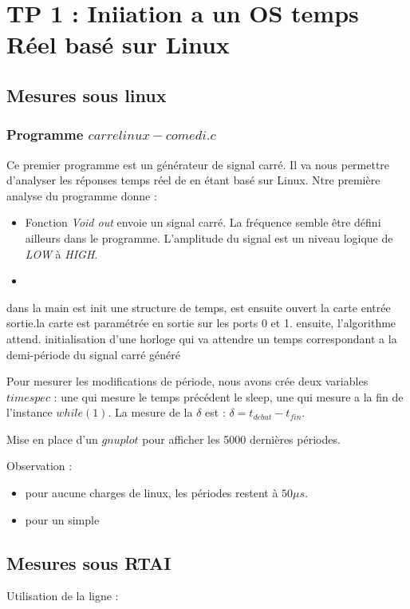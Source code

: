 \chapter{TP 1 : Iniiation a un OS temps Réel basé sur Linux}

\section{Mesures sous linux}
\subsection{Programme $carrelinux-comedi.c$}
Ce premier programme est un générateur de signal carré. Il va nous permettre d'analyser les réponses temps réel de en étant basé sur Linux. Ntre première analyse du programme donne :\begin{itemize}
\item Fonction \emph{Void out} envoie un signal carré. La fréquence semble être défini ailleurs dans le programme. L'amplitude du signal est un niveau logique de \emph{LOW} à \emph{HIGH}.
\item 
\end{itemize}

dans la main est init une structure de temps, est ensuite ouvert la carte entrée sortie.la carte est paramétrée en sortie sur les ports 0 et 1. 
ensuite, l'algorithme attend.
initialisation d'une horloge qui va attendre un temps correspondant a la demi-période  du signal carré généré


Pour mesurer les modifications de période, nous avons crée deux variables $timespec$ : une qui mesure le temps précédent le sleep, une qui mesure a la fin de l'instance $while(1)$. La mesure de la $\delta$ est : $\delta = t_{debut} - t_{fin}$. 

Mise en place d'un $gnuplot$ pour afficher les 5000 dernières périodes. 

Observation : \begin{itemize}
\item pour aucune charges de linux, les périodes restent à $50\mu s$. 
\item pour un simple 
\end{itemize}

\section{Mesures sous RTAI}

Utilisation de la ligne : 


